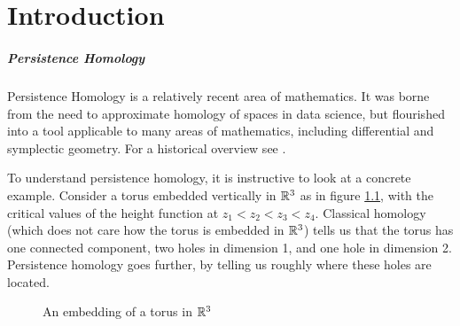
\chapter{Introduction}

\paragraph{Persistence Homology}
Persistence Homology is a relatively recent area of mathematics. It was borne from the need to approximate homology of spaces in data science, but flourished into a tool applicable to many areas of mathematics, including differential and symplectic geometry. For a historical overview see \cite{historypersistence}.

To understand persistence homology, it is instructive to look at a concrete example. Consider a torus embedded vertically in $\mathbb{R}^3$ as in figure \ref{fig:torus1}, with the critical values of the height function at 
$z_1 < z_2 < z_3 < z_4$. Classical homology (which does not care how the torus is embedded in $\mathbb{R}^3$) tells us that the torus has one connected component, two holes in dimension 1, and one hole in dimension 2. Persistence homology goes further, by telling us roughly where these holes are located.

\begin{figure}
\centering
{}
\caption{An embedding of a torus in $\mathbb{R}^3$}\label{fig:torus1}
\end{figure}

